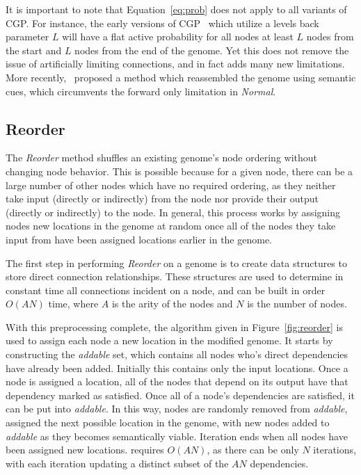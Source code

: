 \documentclass[journal]{IEEEtran}
\begin{document}
It is important to note that Equation~\ref{eq:prob} does not apply to all variants of CGP.
For instance, the early versions of CGP~\cite{miller:2011:chapter2} which utilize a
levels back parameter $L$ will have
a flat active probability for all nodes at least $L$ nodes from the start and $L$ nodes from the end
of the genome.  Yet this does not remove the issue of artificially limiting connections,
and in fact adds many new limitations.  More recently,~\cite{cai:2005:ircgp} proposed
a method which reassembled the genome using semantic cues, which circumvents the
forward only limitation in \emph{Normal}.
\subsection{Reorder}
\label{sec:reorder}
The \emph{Reorder} method shuffles an existing genome's node ordering without
changing node behavior.  This is possible because for a given node, there can
be a large number of other nodes which have no required ordering,
as they neither take input (directly or indirectly) from the node nor provide their
output (directly or indirectly) to the node.  In general, this process works by assigning nodes new
locations in the genome at random once all of the nodes they take input from have been assigned
locations earlier in the genome.

The first step in performing \emph{Reorder} on a genome is to create
data structures to store direct connection relationships.  These structures are used
to determine in constant time all connections incident on a node, and 
can be built in order $O(AN)$ time, where $A$ is the arity of the nodes
and $N$ is the number of nodes.

With this preprocessing complete, the  algorithm given in Figure~\ref{fig:reorder}
is used to assign each node a new location in the modified genome.
It starts by constructing the \emph{addable} set, which contains all nodes who's direct
dependencies have already been added.  Initially this contains only the input locations.
Once a node is assigned a location, all of the nodes that depend on its output
have that dependency marked as satisfied.  Once all of a node's dependencies
are satisfied, it can be put into \emph{addable}.  In this way, nodes are
randomly removed from \emph{addable}, assigned the next possible location
in the genome, with new nodes added to \emph{addable} as they becomes semantically
viable.  Iteration ends when all nodes have been assigned new locations.
 requires $O(AN)$, as there can be only $N$ iterations,
with each iteration updating a distinct subset of the $AN$ dependencies.
\end{document}
